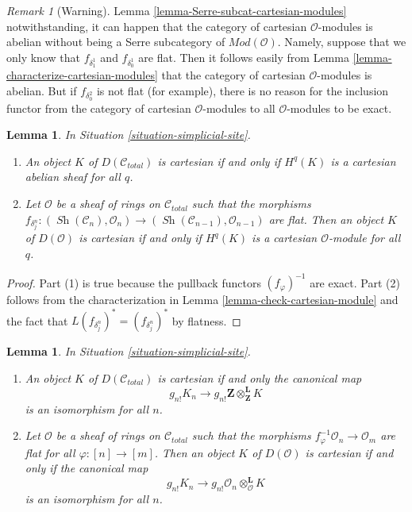 \documentclass{stacks-project}
\theoremstyle{plain}
\newtheorem{lemma}[subsection]{Lemma}
\theoremstyle{definition}
\theoremstyle{remark}
\newtheorem{remark}[subsection]{Remark}
\numberwithin{equation}{subsection}
\def\Sh{\mathop{\mathit{Sh}}\nolimits}
\begin{document}
\begin{remark}[Warning]
\label{remark-warning-cartesian-modules}
Lemma \ref{lemma-Serre-subcat-cartesian-modules} notwithstanding, it
can happen that the category of cartesian $\mathcal{O}$-modules is
abelian without being a Serre subcategory of $\textit{Mod}(\mathcal{O})$.
Namely, suppose that we only know that
$f_{\delta_1^1}$ and $f_{\delta_0^1}$ are flat.
Then it follows easily from
Lemma \ref{lemma-characterize-cartesian-modules}
that the category of cartesian $\mathcal{O}$-modules is abelian.
But if $f_{\delta_0^2}$ is not flat (for example),
there is no reason for the inclusion functor
from the category of cartesian $\mathcal{O}$-modules
to all $\mathcal{O}$-modules to be exact.
\end{remark}

\begin{lemma}
\label{lemma-derived-cartesian-modules}
In Situation \ref{situation-simplicial-site}.
\begin{enumerate}
\item An object $K$ of $D(\mathcal{C}_{total})$ is cartesian if and only
if $H^q(K)$ is a cartesian abelian sheaf for all $q$.
\item Let $\mathcal{O}$ be a sheaf
of rings on $\mathcal{C}_{total}$ such that the morphisms
$f_{\delta^n_j} : (\Sh(\mathcal{C}_n), \mathcal{O}_n)
\to (\Sh(\mathcal{C}_{n - 1}), \mathcal{O}_{n - 1})$ are flat.
Then an object $K$ of $D(\mathcal{O})$ is cartesian if and only
if $H^q(K)$ is a cartesian $\mathcal{O}$-module for all $q$.
\end{enumerate}
\end{lemma}

\begin{proof}
Part (1) is true because the pullback functors $(f_\varphi)^{-1}$
are exact. Part (2) follows from the characterization in
Lemma \ref{lemma-check-cartesian-module}
and the fact that $L(f_{\delta^n_j})^* = (f_{\delta^n_j})^*$
by flatness.
\end{proof}

\begin{lemma}
\label{lemma-derived-cartesian-shriek}
In Situation \ref{situation-simplicial-site}.
\begin{enumerate}
\item An object $K$ of $D(\mathcal{C}_{total})$ is cartesian if and only
the canonical map
$$
g_{n!}K_n \longrightarrow
g_{n!}\mathbf{Z} \otimes^\mathbf{L}_\mathbf{Z} K
$$
is an isomorphism for all $n$.
\item Let $\mathcal{O}$ be a sheaf of rings on $\mathcal{C}_{total}$
such that the morphisms $f_\varphi^{-1}\mathcal{O}_n \to \mathcal{O}_m$
are flat for all $\varphi : [n] \to [m]$. Then an object $K$ of
$D(\mathcal{O})$ is cartesian if and only if the canonical map
$$
g_{n!}K_n \longrightarrow
g_{n!}\mathcal{O}_n \otimes^\mathbf{L}_\mathcal{O} K
$$
is an isomorphism for all $n$.
\end{enumerate}
\end{lemma}
\end{document}
